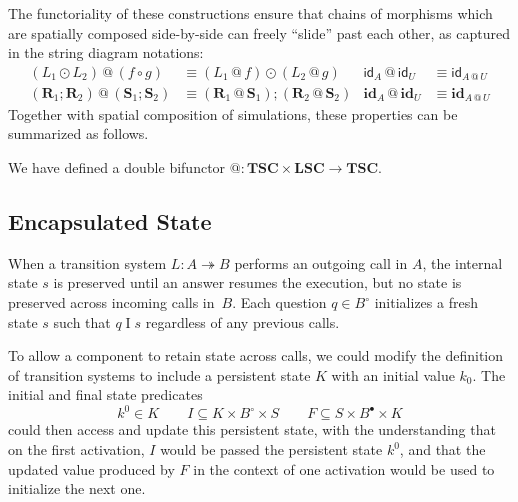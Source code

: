\documentclass[acmsmall,screen,review,anonymous]{acmart}
\newcommand{\kw}[1]{\ensuremath{ \mathsf{#1} }}
\newcommand{\que}{\circ}
\newcommand{\ans}{\bullet}
\newcommand{\intl}[1]{#1^0}
\newcommand{\idsc}{\mathbf{id}} %
\begin{document}
The functoriality of these constructions ensure that
chains of morphisms which are spatially composed side-by-side
can freely ``slide'' past each other,
as captured in the string diagram notations:
\begin{align*}
  (L_1 \odot L_2) \mathbin@ (f \circ g) &\equiv
    (L_1 \mathbin@ f) \odot (L_2 \mathbin@ g)
  &
  \kw{id}_A \mathbin@ \kw{id}_U &\equiv \kw{id}_{A \mathbin@ U}
  \\
  (\mathbf{R}_1 \mathbin; \mathbf{R}_2) \mathbin@
  (\mathbf{S}_1 \mathbin; \mathbf{S}_2) &\equiv
  (\mathbf{R}_1 \mathbin@ \mathbf{S}_1) \mathbin;
  (\mathbf{R}_2 \mathbin@ \mathbf{S}_2)
  &
  \idsc_A \mathbin@ \idsc_U &\equiv \idsc_{A \mathbin@ U}
\end{align*}
Together with spatial composition of simulations,
these properties can be summarized as follows.

\begin{theorem} %
We have defined a double bifunctor
${\mathbin@} : \mathbf{TSC} \times \mathbf{LSC} \rightarrow \mathbf{TSC}$.
\end{theorem}


\subsection{Encapsulated State} \label{sec:encap} %

When a transition system $L : A \twoheadrightarrow B$
performs an outgoing call in $A$,
the internal state $s$ is preserved
until an answer resumes the execution,
but no state is preserved across incoming calls in~$B$.
Each question $q \in B^\que$ initializes a fresh state $s$
such that $q \mathrel{I} s$
regardless of any previous calls. %

To allow a component to retain state across calls,
we could modify the definition of transition systems
to include a persistent state $K$ with an initial value $k_0$.
The initial and final state predicates
\begin{equation} \label{eqn:psts}
  \intl{k} \in K
  \qquad
  I \subseteq K \times B^\que \times S
  \qquad
  F \subseteq S \times B^\ans \times K
\end{equation}
could then access and update this persistent state,
with the understanding that on the first activation,
$I$ would be passed the persistent state $\intl{k}$,
and that the updated value produced by $F$
in the context of one activation
would be used to initialize the next one.
\end{document}
